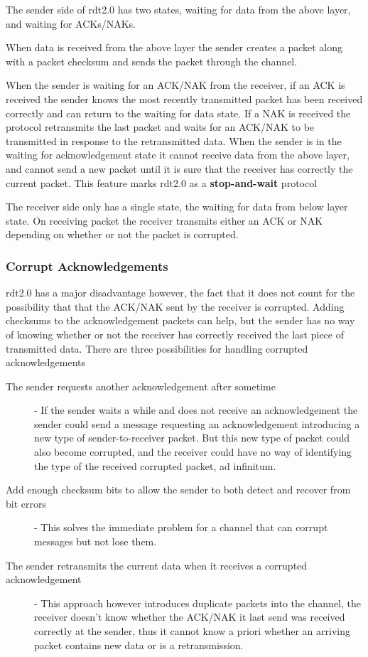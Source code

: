 \documentclass[12pt letter]{report}
\begin{document}
The sender side of rdt2.0 has two states, waiting for data from the
above layer, and waiting for ACKs/NAKs.

When data is received from
the above layer the sender creates a packet along with a packet
checksum and sends the packet through the channel.

When the sender is waiting for an ACK/NAK from the receiver, if an
ACK is received the sender knows the most recently transmitted packet
has been received correctly  and can return to the waiting for data
state. If a NAK is received the protocol retransmits the last packet
and waits for an ACK/NAK to be transmitted in response to the
retransmitted data. When the sender is in the waiting for
acknowledgement state it cannot receive data from the above layer,
and cannot send a new packet until it is sure that the receiver has
correctly the current packet. This feature marks rdt2.0 as a
\textbf{stop-and-wait} protocol

The receiver side only has a single state, the waiting for data from
below layer state. On receiving  packet the receiver transmits either
an ACK or NAK depending on whether or not the packet is corrupted.

\subsubsection{Corrupt Acknowledgements}

rdt2.0 has a major disadvantage however, the fact that it does not
count for the possibility that that the ACK/NAK sent by the receiver
is corrupted. Adding checksums to the acknowledgement packets can
help, but the sender has no way of knowing whether or not the
receiver has correctly received the last piece of transmitted data.
There are three possibilities for handling corrupted acknowledgements

\begin{description}
  \item[The sender requests another acknowledgement after sometime]
    - If the sender waits a while and does not receive an
    acknowledgement the sender could send a message requesting an
    acknowledgement introducing a new type of sender-to-receiver
    packet. But this new type of packet could also become corrupted,
    and the receiver could have no way of identifying the type of the
    received corrupted packet, ad infinitum.
  \item[Add enough checksum bits to allow the sender to both detect
    and recover from bit errors]-
    This solves the immediate problem for a channel that can corrupt
    messages but not lose them.
  \item[The sender retransmits the current data when it receives a
    corrupted acknowledgement] - This approach however introduces
    duplicate packets into the channel, the receiver doesn't know
    whether the ACK/NAK it last send was received correctly at the
    sender, thus it cannot know a priori whether an arriving packet
    contains new data or is a retransmission.
\end{description}
\end{document}
